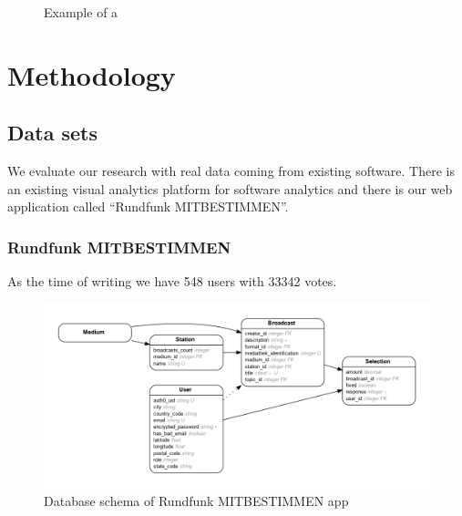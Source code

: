 \documentclass{article}
\begin{document}
\begin{figure}[h]
\centering
\caption{Example of a \cmvs{}}
\label{fig:research:cmv}
\end{figure}

\section{Methodology}

\subsection{Data sets}
We evaluate our research with real data coming from existing software.
There is an existing visual analytics platform for software analytics and there is our web application called ``Rundfunk MITBESTIMMEN''.

\subsubsection{Rundfunk MITBESTIMMEN}
As the time of writing we have 548 users with 33342 votes.

\begin{figure}[h]
\centering
  \includegraphics[width=\textwidth]{images/er}
  \caption{Database schema of Rundfunk MITBESTIMMEN app}
  \label{fig:data:rundfunk}
\end{figure}
\end{document}
